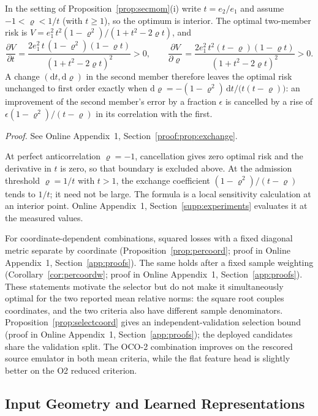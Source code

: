 \documentclass[twoside,11pt]{article}
\begin{document}
\begin{proposition}\label{prop:exchange}
In the setting of Proposition~\ref{prop:secmom}(i) write $t=e_2/e_1$ and
assume $-1<\varrho<1/t$ (with $t\ge1$), so the optimum is interior. The optimal
two-member risk is $V=e_1^2\,t^2(1-\varrho^2)/(1+t^2-2\varrho t)$, and
\[
\frac{\partial V}{\partial t}
=\frac{2e_1^2\,t\,(1-\varrho^2)(1-\varrho t)}{(1+t^2-2\varrho t)^2}>0,
\qquad
\frac{\partial V}{\partial\varrho}
=\frac{2e_1^2\,t^2(t-\varrho)(1-\varrho t)}{(1+t^2-2\varrho t)^2}>0 .
\]
A change $(\mathrm dt,\mathrm d\varrho)$ in the second member therefore
leaves the optimal risk unchanged to first order exactly when
$\mathrm d\varrho=-(1-\varrho^2)\,\mathrm dt/\big(t(t-\varrho)\big)$: an
improvement of the second member's error by a fraction $\epsilon$ is
cancelled by a rise of $\epsilon(1-\varrho^2)/(t-\varrho)$ in its correlation
with the first.
\end{proposition}
\noindent\emph{Proof.} See Online Appendix~1, Section~\ref{proof:prop:exchange}.


At perfect anticorrelation $\varrho=-1$, cancellation gives zero optimal risk and the derivative in $t$ is zero, so that boundary is excluded above. At the admission threshold $\varrho=1/t$ with $t>1$, the exchange coefficient $(1-\varrho^2)/(t-\varrho)$ tends to $1/t$; it need not be large. The formula is a local sensitivity calculation at an interior point. Online Appendix~1, Section~\ref{supp:experiments} evaluates it at the measured values.

For coordinate-dependent combinations, squared losses with a fixed diagonal metric separate by coordinate (Proposition~\ref{prop:percoord}; proof in Online Appendix~1, Section~\ref{app:proofs}). The same holds after a fixed sample weighting (Corollary~\ref{cor:percoordw}; proof in Online Appendix~1, Section~\ref{app:proofs}). These statements motivate the selector but do not make it simultaneously optimal for the two reported mean relative norms: the square root couples coordinates, and the two criteria also have different sample denominators. Proposition~\ref{prop:selectcoord} gives an independent-validation selection bound (proof in Online Appendix~1, Section~\ref{app:proofs}); the deployed candidates share the validation split. The OCO-2 combination improves on the rescored source emulator in both mean criteria, while the flat feature head is slightly better on the O2 reduced criterion.

\subsection{Input Geometry and Learned Representations}
\label{sec:theory-aniso}
\end{document}

